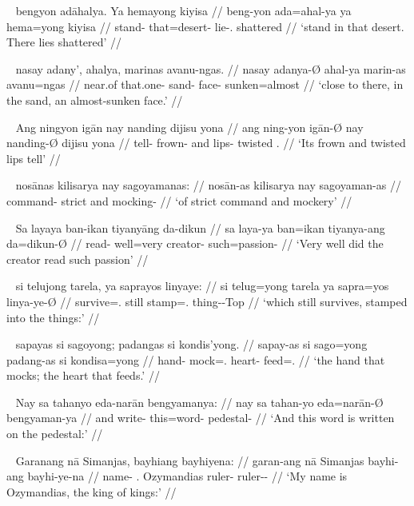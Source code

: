 \ex~\begingl
	\gla bengyon adāhalya. Ya hemayong kiyisa //
	\glb beng-yon ada=ahal-ya ya hema=yong kiyisa //
	\glc stand-\TplN{} that=desert-\Loc{} \LocT{} lie-\TsgN{}.\Aarg{} 
		shattered //
	\glft `stand in that desert. There lies shattered' //
\endgl\xe

\ex~\begingl
	\gla nasay adany', ahalya, marinas avanu-ngas. //
	\glb nasay adanya-Ø ahal-ya marin-as avanu=ngas //
	\glc near.of that.one-\Top{} sand-\Loc{} face-\Parg{} sunken=almost //
	\glft `close to there, in the sand, an almost-sunken face.' //
\endgl\xe

\ex~\begingl
	\gla Ang ningyon igān nay nanding dijisu yona //
	\glb ang ning-yon igān-Ø nay nanding-Ø dijisu yona //
	\glc \AgtT{} tell-\TplN{} frown-\Top{} and lips-\Top{} twisted 
		\TsgN{}.\Gen{} //
	\glft `Its frown and twisted lips tell' //
\endgl\xe

\ex~\begingl
	\gla nosānas kilisarya nay sagoyamanas: //
	\glb nosān-as kilisarya nay sagoyaman-as //
	\glc command-\Parg{} strict and mocking-\Parg{} //
	\glft `of strict command and mockery' //
\endgl\xe

\ex~\begingl
	\gla Sa layaya ban-ikan tiyanyāng da-dikun //
	\glb sa laya-ya ban=ikan tiyanya-ang da=dikun-Ø //
	\glc \PatT{} read-\TsgM{} well=very creator-\Aarg{} such=passion-\Top{} //
	\glft `Very well did the creator read such passion' //
\endgl\xe

\ex~\begingl
	\gla si telujong tarela, ya saprayos linyaye: //
	\glb si telug=yong tarela ya sapra=yos linya-ye-Ø //
	\glc \Rel{} survive=\TsgN{}.\Aarg{} still \LocT{} stamp=\TsgN{}.\Parg{} 
		thing-\Pl{}-Top{} //
	\glft `which still survives, stamped into the things:' //
\endgl\xe

\ex~\begingl
	\gla sapayas si sagoyong; padangas si kondis'yong. //
	\glb sapay-as si sago=yong padang-as si kondisa=yong //
	\glc hand-\Parg{} \Rel{} mock=\TsgN{}.\Aarg{} heart-\Parg{} \Rel{} 
		feed=\TsgN{}.\Aarg{} //
	\glft `the hand that mocks; the heart that feeds.' //
\endgl\xe

\ex~\begingl
	\gla Nay sa tahanyo eda-narān bengyamanya: //
	\glb nay sa tahan-yo eda=narān-Ø bengyaman-ya //
	\glc and \PatT{} write-\TsgN{} this=word-\Top{} pedestal-\Loc{} //
	\glft `And this word is written on the pedestal:' //
\endgl\xe

\ex~\begingl
	\gla Garanang nā Simanjas, bayhiang bayhiyena: //
	\glb garan-ang nā Simanjas bayhi-ang bayhi-ye-na //
	\glc name-\Aarg{} \Fsg{}.\Gen{} Ozymandias ruler-\Aarg{} 
			ruler-\Pl{}-\Gen{} //
	\glft `My name is Ozymandias, the king of kings:' //
\endgl\xe


